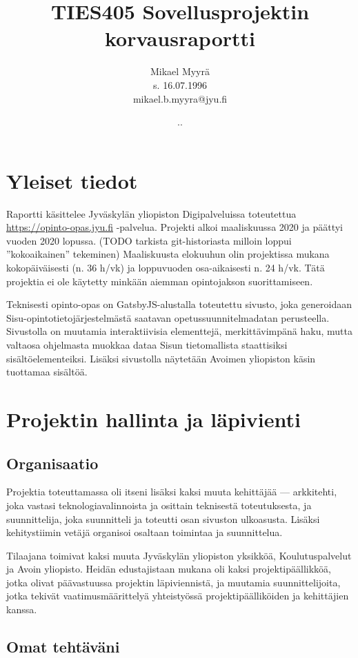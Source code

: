 \documentclass{article}
\title{TIES405 Sovellusprojektin korvausraportti}
\author{
Mikael Myyrä \\
s. 16.07.1996\\
mikael.b.myyra@jyu.fi\\
}
\date{\number\day.\number\month.\number\year}
\begin{document}
\maketitle

\section{Yleiset tiedot}

Raportti käsittelee Jyväskylän yliopiston Digipalveluissa toteutettua
\url{https://opinto-opas.jyu.fi} -palvelua.
Projekti alkoi maaliskuussa 2020 ja päättyi vuoden 2020 lopussa. (TODO tarkista git-historiasta milloin loppui ''kokoaikainen'' tekeminen)
Maaliskuusta elokuuhun olin projektissa mukana kokopäiväisesti (n. 36 h/vk) ja
loppuvuoden osa-aikaisesti n. 24 h/vk. Tätä projektia ei ole käytetty minkään
aiemman opintojakson suorittamiseen.

Teknisesti opinto-opas on GatsbyJS-alustalla toteutettu sivusto, joka
generoidaan Sisu-opintotieto\-järjestelmästä saatavan opetussuunnitelmadatan
perusteella. Sivustolla on muutamia interaktiivisia elementtejä,
merkittävimpänä haku, mutta valtaosa ohjelmasta muokkaa dataa Sisun
tieto\-mallista staattisiksi sisältöelementeiksi. Lisäksi sivustolla näytetään
Avoimen yliopiston käsin tuottamaa sisältöä.

\section{Projektin hallinta ja läpivienti}

\subsection{Organisaatio}

Projektia toteuttamassa oli itseni lisäksi kaksi muuta kehittäjää — arkkitehti,
joka vastasi teknologiavalinnoista ja osittain teknisestä toteutuksesta,
ja suunnittelija, joka suunnitteli ja toteutti osan sivuston ulkoasusta.
Lisäksi kehitystiimin vetäjä organisoi osaltaan toimintaa ja suunnittelua.

Tilaajana toimivat kaksi muuta Jyväskylän yliopiston yksikköä,
Koulutuspalvelut ja Avoin yliopisto. Heidän edustajistaan mukana oli kaksi
projektipäällikköä, jotka olivat päävastuussa projektin läpiviennistä, ja
muutamia suunnittelijoita, jotka tekivät vaatimusmäärittelyä yhteistyössä
projektipäälliköiden ja kehittäjien kanssa.

\subsection{Omat tehtäväni}
\end{document}
